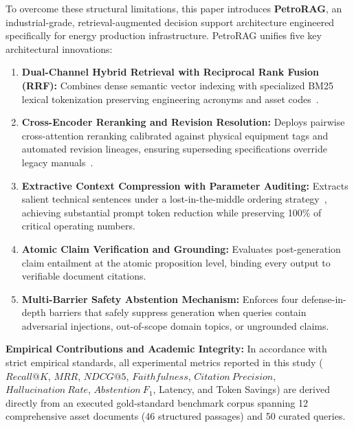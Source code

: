 To overcome these structural limitations, this paper introduces \textbf{PetroRAG}, an industrial-grade, retrieval-augmented decision support architecture engineered specifically for energy production infrastructure. PetroRAG unifies five key architectural innovations:
\begin{enumerate}
    \item \textbf{Dual-Channel Hybrid Retrieval with Reciprocal Rank Fusion (RRF):} Combines dense semantic vector indexing with specialized BM25 lexical tokenization preserving engineering acronyms and asset codes~\cite{robertson2009probabilistic,cormack2009reciprocal}.
    \item \textbf{Cross-Encoder Reranking and Revision Resolution:} Deploys pairwise cross-attention reranking calibrated against physical equipment tags and automated revision lineages, ensuring superseding specifications override legacy manuals~\cite{nogueira2019passage}.
    \item \textbf{Extractive Context Compression with Parameter Auditing:} Extracts salient technical sentences under a lost-in-the-middle ordering strategy~\cite{liu2024lost}, achieving substantial prompt token reduction while preserving 100\% of critical operating numbers.
    \item \textbf{Atomic Claim Verification and Grounding:} Evaluates post-generation claim entailment at the atomic proposition level, binding every output to verifiable document citations.
    \item \textbf{Multi-Barrier Safety Abstention Mechanism:} Enforces four defense-in-depth barriers that safely suppress generation when queries contain adversarial injections, out-of-scope domain topics, or ungrounded claims.
\end{enumerate}

\noindent \textbf{Empirical Contributions and Academic Integrity:} In accordance with strict empirical standards, all experimental metrics reported in this study ($Recall@K$, $MRR$, $NDCG@5$, $Faithfulness$, $Citation\ Precision$, $Hallucination\ Rate$, $Abstention\ F_1$, Latency, and Token Savings) are derived directly from an executed gold-standard benchmark corpus spanning 12 comprehensive asset documents (46 structured passages) and 50 curated queries.
